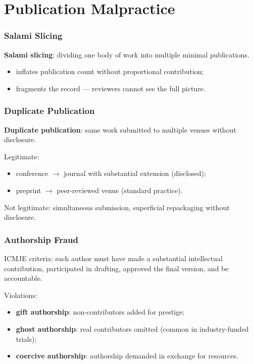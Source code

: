\documentclass[]{beamer}
\begin{document}
\section{Publication Malpractice}

\begin{frame}[fragile]
\frametitle{Salami Slicing}
\textbf{Salami slicing}: dividing one body of work into multiple minimal publications.

\begin{itemize}
  \item inflates publication count without proportional contribution;
  \item fragments the record — reviewers cannot see the full picture.
\end{itemize}

\end{frame}

\begin{frame}[fragile]
\frametitle{Duplicate Publication}
\textbf{Duplicate publication}: same work submitted to multiple venues without disclosure.

Legitimate:
\begin{itemize}
  \item conference $\to$ journal with substantial extension (disclosed);
  \item preprint $\to$ peer-reviewed venue (standard practice).
\end{itemize}

Not legitimate: simultaneous submission, superficial repackaging without disclosure.

\end{frame}

\begin{frame}[fragile]
\frametitle{Authorship Fraud}
ICMJE criteria: each author must have made a substantial intellectual contribution, participated in drafting, approved the final version, and be accountable.

Violations:
\begin{itemize}
  \item \textbf{gift authorship}: non-contributors added for prestige;
  \item \textbf{ghost authorship}: real contributors omitted (common in industry-funded trials);
  \item \textbf{coercive authorship}: authorship demanded in exchange for resources.
\end{itemize}

\end{frame}
\end{document}
